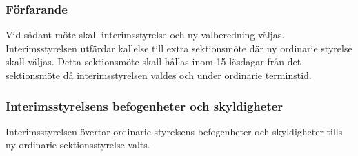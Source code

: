 \subsubsection{Förfarande}
Vid sådant möte skall interimsstyrelse och ny valberedning väljas. Interimsstyrelsen utfärdar kallelse till extra sektionsmöte där ny ordinarie styrelse skall väljas. Detta sektionsmöte skall hållas inom 15 läsdagar från det sektionsmöte då interimsstyrelsen valdes och under ordinarie terminstid.

\subsubsection{Interimsstyrelsens befogenheter och skyldigheter}
Interimsstyrelsen övertar ordinarie styrelsens befogenheter och skyldigheter tills ny ordinarie sektionsstyrelse valts.


